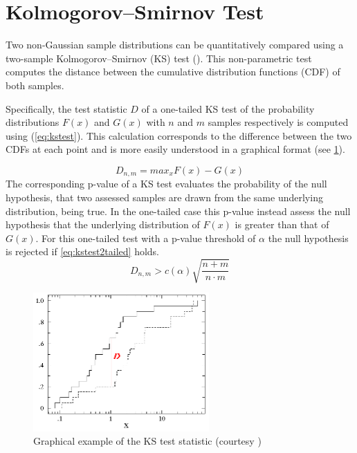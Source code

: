 \section{Kolmogorov–Smirnov Test}
Two non-Gaussian sample distributions can be quantitatively compared using a two-sample Kolmogorov–Smirnov (KS) test (\cite{kakkavas_review_2020}). This non-parametric test computes the distance between the cumulative distribution functions (CDF) of both samples.\par
Specifically, the test statistic $D$ of a one-tailed KS test of the probability distributions $F(x)$ and $G(x)$ with $n$ and $m$ samples respectively is computed using (\cref{eq:kstest}). This calculation corresponds to the difference between the two CDFs at each point and is more easily understood in a graphical format (see \cref{fig:kstestplot}).\par
\begin{equation}
\label{eq:kstest}
    D_{n,m} = max_x F(x)-G(x)
\end{equation}
The corresponding p-value of a KS test evaluates the probability of the null hypothesis, that two assessed samples are drawn from the same underlying distribution, being true. In the one-tailed case this p-value instead assess the null hypothesis that the underlying distribution of $F(x)$ is greater than that of $G(x)$. For this one-tailed test with a p-value threshold of $\alpha$ the null hypothesis is rejected if \cref{eq:kstest2tailed} holds.
\begin{equation}
\label{eq:kstest2tailed}
    D_{n,m} > c(\alpha)\sqrt{\frac{n+m}{n\cdot m}}
\end{equation}
\begin{figure}[H]
    \centering
    \includegraphics[width=0.6\textwidth]{figs/background/KS_test_comparison.png}
    \caption[Graphical example of the KS test statistic]{Graphical example of the KS test statistic (courtesy \cite{kirkman_kolmogorov-smirnov_1996})}
    \label{fig:kstestplot}
\end{figure}


